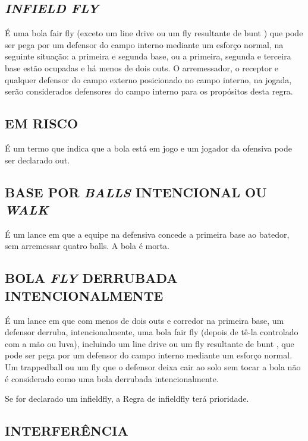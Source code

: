 \subsection{\textit{INFIELD FLY}}

 É uma bola \gls{fair fly} (exceto um \gls{line drive} ou um \gls{fly} resultante de \gls{bunt} ) que pode ser pega por um defensor do campo interno mediante um esforço normal, na seguinte situação: a primeira e segunda base, ou a primeira, segunda e terceira base estão ocupadas e há menos de dois \glspl{out}. O arremessador, o receptor e qualquer defensor do campo externo posicionado no campo interno, na jogada, serão considerados defensores do campo interno para os propósitos desta regra.

\subsection{EM RISCO}

É um termo que indica que a bola está em jogo e um jogador da ofensiva pode ser declarado \gls{out}.

\subsection{BASE POR \textit{BALLS} INTENCIONAL OU \textit{WALK}}
 É um lance em que a equipe na defensiva concede a primeira base ao batedor, sem arremessar quatro \glspl{ball}. A bola é morta.


\subsection{BOLA \textit{FLY} DERRUBADA INTENCIONALMENTE}

 É um lance em que com menos de dois \glspl{out} e corredor na primeira base, um defensor derruba, intencionalmente, uma bola \gls{fair fly} (depois de tê-la controlado com a mão ou luva), incluindo um \gls{line drive} ou um \gls{fly} resultante de \gls{bunt} , que pode ser pega por um defensor do campo interno mediante um  esforço normal. Um \gls{trappedball} ou um \gls{fly} que o defensor deixa cair ao solo sem tocar a bola não é considerado como uma bola derrubada intencionalmente.

 Se for declarado um \gls{infieldfly}, a Regra de \gls{infieldfly} terá prioridade.

 \subsection{INTERFERÊNCIA}

